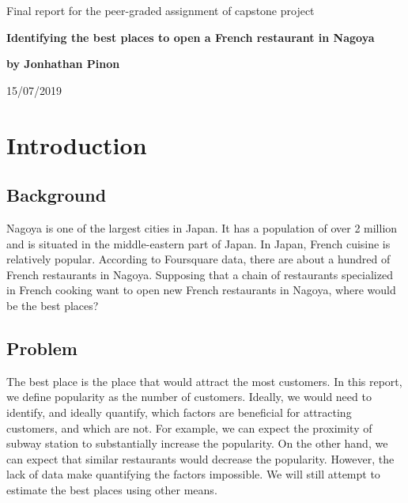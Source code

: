 \documentclass[12pt,a4paper]{article}
\begin{document}
%

\begin{titlepage}

\vspace{5 cm}

\begin{center}

\Huge Final report for the peer-graded assignment of capstone project

\vspace{3 cm}

\Huge \textbf{Identifying the best places to open a French restaurant in Nagoya}

\vspace{2 cm}

\Large \textbf{by Jonhathan Pinon} \\

\vspace{2 cm}


\large 15/07/2019


\end{center}

\end{titlepage}

\clearpage
\tableofcontents
{}

\listoffigures


\pagestyle{IHA-fancy-style}


\section{Introduction}

\subsection{Background}


Nagoya is one of the largest cities in Japan. It has a population of over 2 million and is situated in the middle-eastern part of Japan. In Japan, French cuisine is relatively popular. According to Foursquare data, there are about a hundred of French restaurants in Nagoya. Supposing that a chain of restaurants specialized in French cooking want to open new French restaurants in Nagoya, where would be the best places? 

\subsection{Problem}

The best place is the place that would attract the most customers. In this report, we define popularity as the number of customers. Ideally, we would need to identify, and ideally quantify, which factors are beneficial for attracting customers, and which are not. For example, we can expect the proximity of subway station to substantially increase the popularity. On the other hand, we can expect that similar restaurants would decrease the popularity. However, the lack of data make quantifying the factors impossible. We will still attempt to estimate the best places using other means.
\end{document}
